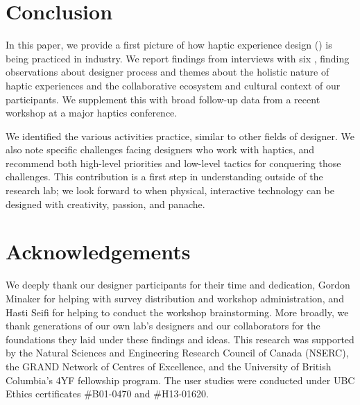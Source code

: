 %
%
\section{Conclusion}
\noindent In this paper, we provide a first picture of how haptic experience design (\haxd) is being practiced in industry.
We report findings from interviews with six , finding observations about designer process and themes about the holistic nature of haptic experiences and the collaborative ecosystem and cultural context of our participants.
We supplement this with broad follow-up data from a recent workshop at a major haptics conference.

We identified the various activities  practice, similar to other fields of designer.
We also note specific challenges facing designers who work with haptics, and recommend both high-level priorities and low-level tactics for %
conquering those challenges.
This contribution is a first step in understanding \haxd outside of the research lab; we look forward to when physical, interactive technology can be designed with creativity, passion, and panache.


\section{Acknowledgements}
\noindent
We deeply thank our designer participants for their time and dedication, Gordon Minaker for helping with survey distribution and workshop administration, and Hasti Seifi for helping to conduct the workshop brainstorming.
More broadly, we thank generations of our own lab's designers and our collaborators for the foundations they laid under these findings and ideas.
This research was supported by the Natural Sciences and Engineering Research Council of Canada (NSERC), the GRAND Network of Centres of Excellence, and the University of British Columbia's 4YF fellowship program. The user studies were conducted under UBC Ethics certificates \#B01-0470 and \#H13-01620.



\endinput

